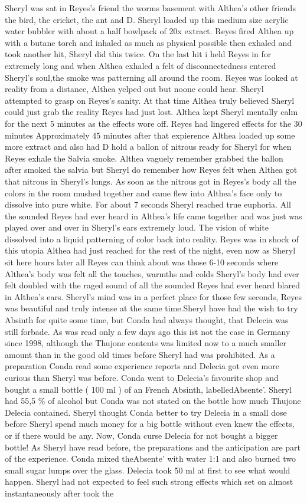\documentclass[12pt]{book}
\begin{document}
Sheryl was sat in Reyes's friend the worms basement with Althea's other friends the bird, the cricket, the ant and D. Sheryl loaded up this medium size acrylic water bubbler with about a half bowlpack of 20x extract. Reyes fired Althea up with a butane torch and inhaled as much as physical possible then exhaled and took another hit, Sheryl did this twice. On the last hit i held Reyes in for extremely long and when Althea exhaled a felt of disconnectedness entered Sheryl's soul,the smoke was patterning all around the room. Reyes was looked at reality from a distance, Althea yelped out but noone could hear. Sheryl attempted to grasp on Reyes's sanity. At that time Althea truly believed Sheryl could just grab the reality Reyes had just lost. Althea kept Sheryl mentally calm for the next 5 minutes as the effects wore off. Reyes had lingered effects for the 30 minutes Approximately 45 minutes after that expierence Althea loaded up some more extract and also had D hold a ballon of nitrous ready for Sheryl for when Reyes exhale the Salvia smoke. Althea vaguely remember grabbed the ballon after smoked the salvia but Sheryl do remember how Reyes felt when Althea got that nitrous in Sheryl's lungs. As soon as the nitrous got in Reyes's body all the colors in the room mushed together and came flew into Althea's face only to dissolve into pure white. For about 7 seconds Sheryl reached true euphoria. All the sounded Reyes had ever heard in Althea's life came together and was just was played over and over in Sheryl's ears extremely loud. The vision of white dissolved into a liquid patterning of color back into reality. Reyes was in shock of this utopia Althea had just reached for the rest of the night, even now as Sheryl sit here hours later all Reyes can think about was those 6-10 seconds where Althea's body was felt all the touches, warmths and colds Sheryl's body had ever felt doubled with the raged sound of all the sounded Reyes had ever heard blared in Althea's ears. Sheryl's mind was in a perfect place for those few seconds, Reyes was beautiful and truly intense at the same time.Sheryl have had the wish to try Absinth for quite some time, but Conda had always thought, that Delecia was still forbade. As was read only a few days ago this ist not the case in Germany since 1998, although the Thujone contents was limited now to a much smaller amount than in the good old times before Sheryl had was prohibited. As a preparation Conda read some experience reports and Delecia got even more curious than Sheryl was before. Conda went to Delecia's favourite shop and bought a small bottle ( 100 ml ) of an French Absinth, labelledAbsente'. Sheryl had 55,5 \% of alcohol but Conda was not stated on the bottle how much Thujone Delecia contained. Sheryl thought Conda better to try Delecia in a small dose before Sheryl spend much money for a big bottle without even knew the effects, or if there would be any. Now, Conda curse Delecia for not bought a bigger bottle! As Sheryl have read before, the preparations and the anticipation are part of the experience. Conda mixed theAbsente' with water 1:1 and also burned two small sugar lumps over the glass. Delecia took 50 ml at first to see what would happen. Sheryl had not expected to feel such strong effects which set on almost instantaneously after took the 
\end{document}
